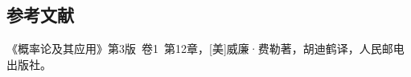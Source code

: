 \documentclass{article}
\begin{document}
\begin{CJK}{UTF8}{gbsn}
\section{参考文献}
《概率论及其应用》第3版\ 卷1\ 第12章，[美]威廉·费勒著，胡迪鹤译，人民邮电出版社。
\end{CJK}
\end{document}

